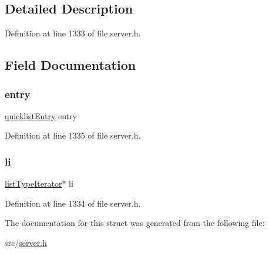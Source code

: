 \subsection{Detailed Description}


Definition at line 1333 of file server.\+h.



\subsection{Field Documentation}
\mbox{\label{structlist_type_entry_aca59553f4ef8969fab89ee54734cc60b}} 
\subsubsection{\texorpdfstring{entry}{entry}}
{\footnotesize\ttfamily \hyperlink{structquicklist_entry}{quicklist\+Entry} entry}



Definition at line 1335 of file server.\+h.

\mbox{\label{structlist_type_entry_a3d40727d2b97a1eee7c2775aa8ec35c6}} 
\subsubsection{\texorpdfstring{li}{li}}
{\footnotesize\ttfamily \hyperlink{structlist_type_iterator}{list\+Type\+Iterator}$\ast$ li}



Definition at line 1334 of file server.\+h.



The documentation for this struct was generated from the following file\+:\begin{DoxyCompactItemize}
\item 
src/\hyperlink{server_8h}{server.\+h}\end{DoxyCompactItemize}
